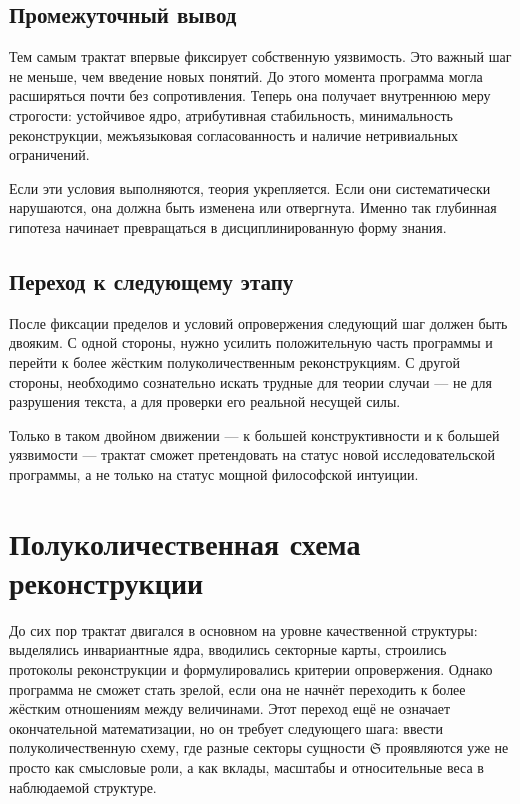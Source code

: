 \documentclass[12pt,a4paper]{article}
\begin{document}
\subsection{Промежуточный вывод}

Тем самым трактат впервые фиксирует собственную уязвимость. Это важный шаг не меньше, чем введение новых понятий. До этого момента программа могла расширяться почти без сопротивления. Теперь она получает внутреннюю меру строгости: устойчивое ядро, атрибутивная стабильность, минимальность реконструкции, межъязыковая согласованность и наличие нетривиальных ограничений.

Если эти условия выполняются, теория укрепляется. Если они систематически нарушаются, она должна быть изменена или отвергнута. Именно так глубинная гипотеза начинает превращаться в дисциплинированную форму знания.

\subsection{Переход к следующему этапу}

После фиксации пределов и условий опровержения следующий шаг должен быть двояким. С одной стороны, нужно усилить положительную часть программы и перейти к более жёстким полуколичественным реконструкциям. С другой стороны, необходимо сознательно искать трудные для теории случаи --- не для разрушения текста, а для проверки его реальной несущей силы.

Только в таком двойном движении --- к большей конструктивности и к большей уязвимости --- трактат сможет претендовать на статус новой исследовательской программы, а не только на статус мощной философской интуиции.


\section{Полуколичественная схема реконструкции}

До сих пор трактат двигался в основном на уровне качественной структуры: выделялись инвариантные ядра, вводились секторные карты, строились протоколы реконструкции и формулировались критерии опровержения. Однако программа не сможет стать зрелой, если она не начнёт переходить к более жёстким отношениям между величинами. Этот переход ещё не означает окончательной математизации, но он требует следующего шага: ввести полуколичественную схему, где разные секторы сущности \(\mathfrak{S}\) проявляются уже не просто как смысловые роли, а как вклады, масштабы и относительные веса в наблюдаемой структуре.
\end{document}
